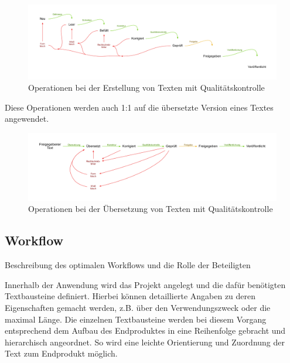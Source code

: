 \begin{figure}[htb]
\begin{center}
\includegraphics[width=\textwidth]{media/chart-4.pdf}
\end{center}
\caption{Operationen bei der Erstellung von Texten mit Qualitätskontrolle}
\label{chart:4}
\end{figure}

Diese Operationen werden auch 1:1 auf die übersetzte Version eines Textes angewendet.

\begin{figure}[htb]
\begin{center}
\includegraphics[width=\textwidth]{media/chart-5.pdf}
\end{center}
\caption{Operationen bei der Übersetzung von Texten mit Qualitätskontrolle}
\label{chart:5}
\end{figure}


\subsection{Workflow}

Beschreibung des optimalen Workflows und die Rolle der Beteiligten

Innerhalb der Anwendung wird das Projekt angelegt und die dafür benötigten Textbausteine definiert. Hierbei können detaillierte Angaben zu deren Eigenschaften gemacht werden, z.B. über den Verwendungszweck oder die maximal Länge. Die einzelnen Textbausteine werden bei diesem Vorgang entsprechend dem Aufbau des Endproduktes in eine Reihenfolge gebracht und hierarchisch angeordnet. So wird eine leichte Orientierung und Zuordnung der Text zum Endprodukt möglich. 

